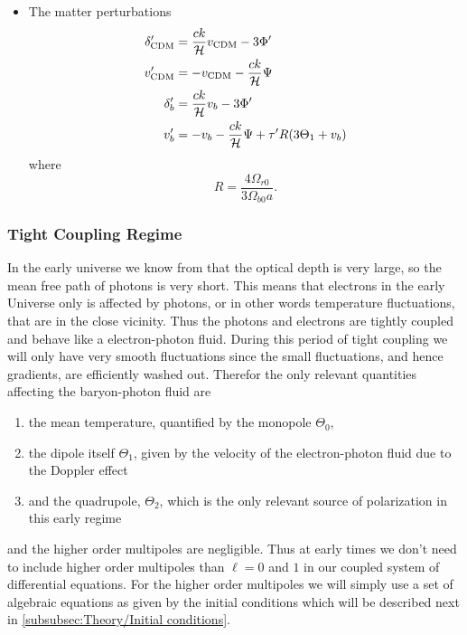 \documentclass[10pt,a4paper]{article}
\begin{document}
\begin{itemize}

\item The matter perturbations
\begin{align}
  \delta_{\rm CDM}^\prime &= \frac{ck}{\mathcal{H}} v_{\rm CDM} - 3\Phi^\prime \\
  v_{\rm CDM}^\prime &= -v_{\rm CDM} -\frac{ck}{\mathcal{H}} \Psi \\
  \delta_b^\prime &= \frac{ck}{\mathcal{H}}v_b -3\Phi^\prime \\
  v_b^\prime &= -v_b - \frac{ck}{\mathcal{H}}\Psi + \tau^\prime R(3\Theta_1 + v_b)
\end{align}
where
\begin{equation}
  R = \frac{4\Omega_{r0}}{3\Omega_{b0}a}.
  \label{eq:R}
\end{equation}
\end{itemize}

\subsubsection{Tight Coupling Regime}
\label{subsubsec:Theory/Tight Coupling}
In the early universe we know from \cite{milestone2} that the optical depth is very large, so the mean free path of photons is very short. This means that electrons in the early Universe only is affected by photons, or in other words temperature fluctuations, that are in the close vicinity. Thus the photons and electrons are tightly coupled and behave like a electron-photon fluid. During this period of tight coupling we will only have very smooth fluctuations since the small fluctuations, and hence gradients, are efficiently washed out. Therefor the only relevant quantities affecting the baryon-photon fluid are
\begin{enumerate}
  \item the mean temperature, quantified by the monopole $\Theta_0$,
  \item the dipole itself $\Theta_1$, given by the velocity of the electron-photon fluid due to the Doppler effect
  \item and the quadrupole, $\Theta_2$, which is the only relevant source of polarization in this early regime
\end{enumerate}
and the higher order multipoles are negligible. Thus at early times we don't need to include higher order multipoles than $\ell = 0$ and $1$ in our coupled system of differential equations. For the higher order multipoles we will simply use a set of algebraic equations as given by the initial conditions which will be described next in \cref{subsubsec:Theory/Initial conditions}.
\end{document}
